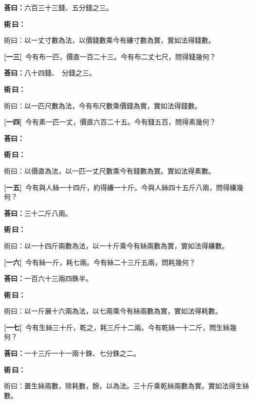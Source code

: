 \documentclass[11pt,a4paper]{article}
\newenvironment{method}{%
  \par\noindent\textcolor{methodcolor}{\textbf{術\,曰：}}%
  \ignorespaces
}{\par\vspace{0.5em}}
\newcommand{\problemnum}[1]{\textbf{[\ignorespaces#1\unskip]}}
\begin{document}
\noindent\textcolor{answercolor}{\textbf{荅曰：}}六百三十三錢、五分錢之三。

\begin{method}
術曰：以一丈寸數為法，以價錢數乘今有縑寸數為實，實如法得錢數。
\end{method}

\noindent\problemnum{一三}\,
今有布一匹，價直一百二十三。今有布二丈七尺，問得錢幾何？

\noindent\textcolor{answercolor}{\textbf{荅曰：}}八十四錢、　分錢之三。

\begin{method}
術曰：以一匹尺數為法，今有布尺數乘價錢為實，實如法得錢數。
\end{method}

\noindent\problemnum{一四}\,
今有素一匹一丈，價直六百二十五。今有錢五百，問得素幾何？

\noindent\textcolor{answercolor}{\textbf{荅曰：}}

\begin{method}
術曰：以價直為法，以一匹一丈尺數乘今有錢數為實。實如法得素數。
\end{method}

\noindent\problemnum{一五}\,
今有與人絲一十四斤，約得縑一十斤。今與人絲四十五斤八兩，問得縑幾何？

\noindent\textcolor{answercolor}{\textbf{荅曰：}}三十二斤八兩。

\begin{method}
術曰：以一十四斤兩數為法，以一十斤乘今有絲兩數為實，實如法得縑數。
\end{method}

\noindent\problemnum{一六}\,
今有絲一斤，耗七兩。今有絲二十三斤五兩，問耗幾何？

\noindent\textcolor{answercolor}{\textbf{荅曰：}}一百六十三兩四銖半。

\begin{method}
術曰：以一斤展十六兩為法，以七兩乘今有絲兩數為實，實如法得耗數。
\end{method}

\noindent\problemnum{一七}\,
今有生絲三十斤，乾之，耗三斤十二兩。今有乾絲一十二斤，問生絲幾何？

\noindent\textcolor{answercolor}{\textbf{荅曰：}}一十三斤一十一兩十銖、七分銖之二。

\begin{method}
術曰：置生絲兩數，除耗數，餘，以為法。三十斤乘乾絲兩數為實。實如法得生絲數。
\end{method}
\end{document}
